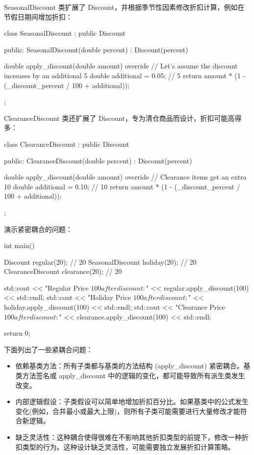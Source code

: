 SeasonalDiscount 类扩展了 Discount，并根据季节性因素修改折扣计算，例如在节假日期间增加折扣：

\begin{cpp}
class SeasonalDiscount : public Discount {
public:
    SeasonalDiscount(double percent) : Discount(percent) {}

    double apply_discount(double amount) override {
        // Let's assume the discount increases by an additional 5%
        double additional = 0.05; // 5%
        return amount * (1 - (_discount_percent / 100 + additional));
    }
};
\end{cpp}


ClearanceDiscount 类还扩展了 Discount，专为清仓商品而设计，折扣可能高得多：

\begin{cpp}
class ClearanceDiscount : public Discount {
public:
    ClearanceDiscount(double percent) : Discount(percent) {}

    double apply_discount(double amount) override {
        // Clearance items get an extra 10%
        double additional = 0.10; // 10%
        return amount * (1 - (_discount_percent / 100 + additional));
    }
};
\end{cpp}

演示紧密耦合的问题：

\begin{cpp}
int main() {
    Discount regular(20); // 20%
    SeasonalDiscount holiday(20); // 20%
    ClearanceDiscount clearance(20); // 20%

    std::cout << "Regular Price $100 after discount: $" << regular.apply_discount(100) << std::endl;
    std::cout << "Holiday Price $100 after discount: $" << holiday.apply_discount(100) << std::endl;
    std::cout << "Clearance Price $100 after discount: $" << clearance.apply_discount(100) << std::endl;

    return 0;
}
\end{cpp}


下面列出了一些紧耦合问题：

\begin{itemize}
\item
依赖基类方法：所有子类都与基类的方法结构 (apply\_discount) 紧密耦合。基类方法签名或 apply\_discount 中的逻辑的变化，都可能导致所有派生类发生改变。

\item
内部逻辑假设：子类假设可以简单地增加折扣百分比。如果基类中的公式发生变化(例如，合并最小或最大上限)，则所有子类可能需要进行大量修改才能符合新逻辑。

\item
缺乏灵活性：这种耦合使得很难在不影响其他折扣类型的前提下，修改一种折扣类型的行为。这种设计缺乏灵活性，可能需要独立发展折扣计算策略。
\end{itemize}

